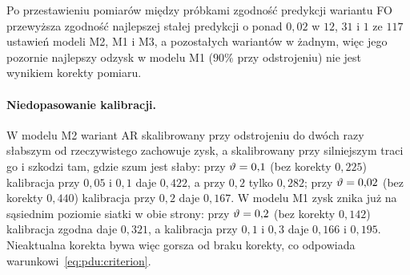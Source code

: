 Po przestawieniu pomiarów między próbkami zgodność predykcji wariantu FO przewyższa zgodność najlepszej stałej predykcji o ponad $0{,}02$ w $12$, $31$ i $1$ ze $117$ ustawień modeli M2, M1 i M3, a pozostałych wariantów w żadnym, więc jego pozornie najlepszy odzysk w modelu M1 ($90\%$ przy odstrojeniu) nie jest wynikiem korekty pomiaru.

\paragraph{Niedopasowanie kalibracji.}
W modelu M2 wariant AR skalibrowany przy odstrojeniu do dwóch razy słabszym od rzeczywistego zachowuje zysk, a skalibrowany przy silniejszym traci go i szkodzi tam, gdzie szum jest słaby: przy $\vartheta=0{,}1$ (bez korekty $0{,}225$) kalibracja przy $0{,}05$ i $0{,}1$ daje $0{,}422$, a przy $0{,}2$ tylko $0{,}282$; przy $\vartheta=0{,}02$ (bez korekty $0{,}440$) kalibracja przy $0{,}2$ daje $0{,}167$.
W modelu M1 zysk znika już na sąsiednim poziomie siatki w obie strony: przy $\vartheta=0{,}2$ (bez korekty $0{,}142$) kalibracja zgodna daje $0{,}321$, a kalibracja przy $0{,}1$ i $0{,}3$ daje $0{,}166$ i $0{,}195$.
Nieaktualna korekta bywa więc gorsza od braku korekty, co odpowiada warunkowi~\eqref{eq:pdu:criterion}.

